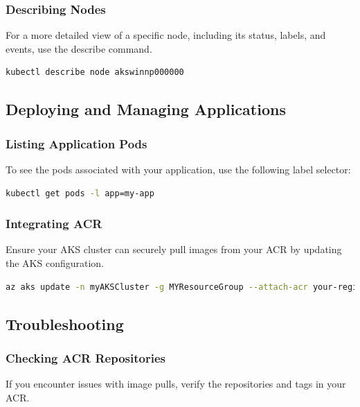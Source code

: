 \documentclass{article}
\begin{document}
\subsubsection{Describing Nodes} 

For a more detailed view of a specific node, including its status, labels, and events, use the describe command.

\begin{lstlisting}[language=bash]
kubectl describe node akswinnp000000
\end{lstlisting}

\subsection{Deploying and Managing Applications}

\subsubsection{Listing Application Pods} 

To see the pods associated with your application, use the following label selector:

\begin{lstlisting}[language=bash]
kubectl get pods -l app=my-app
\end{lstlisting}

\subsubsection{Integrating ACR}  

Ensure your AKS cluster can securely pull images from your ACR by updating the AKS configuration.

\begin{lstlisting}[language=bash]
az aks update -n myAKSCluster -g MYResourceGroup --attach-acr your-registry-name
\end{lstlisting}

\subsection{Troubleshooting}

\subsubsection{Checking ACR Repositories}

If you encounter issues with image pulls, verify the repositories and tags in your ACR.
\end{document}
